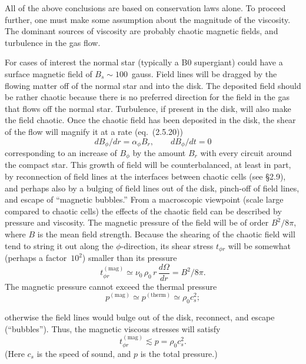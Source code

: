 All of the above conclusions are based on conservation laws alone. To proceed
further, one must make some assumption about the magnitude of the viscosity.
The dominant sources of viscosity are probably chaotic magnetic fields, and
turbulence in the gas flow.

For cases of interest the normal star (typically a B0 supergiant) could
have a surface magnetic field of $B_s \sim 100$~gauss. Field lines will be dragged
by the flowing matter off of the normal star and into the disk. The deposited field
should be rather chaotic because there is no preferred direction for the field
in the gas that flows off the normal star. Turbulence, if present in the disk,
will also make the field chaotic. Once the chaotic field has been deposited in
the disk, the shear of the flow will magnify it at a rate (eq.~(2.5.20))
\begin{equation}
dB_\phi/dr = \alpha_\phi B_r,\qquad dB_\phi/dt = 0
\tag{5.2.26}
\end{equation}
corresponding to an increase of $B_\phi$ by the amount $B_r$ with every circuit around
the compact star. This growth of field will be counterbalanced, at least in part,
by reconnection of field lines at the interfaces between chaotic cells (see \S2.9),
and perhaps also by a bulging of field lines out of the disk, pinch-off of field
lines, and escape of ``magnetic bubbles.'' From a macroscopic viewpoint (scale
large compared to chaotic cells) the effects of the chaotic field can be described by
pressure and viscosity. The magnetic pressure of the field will be of order $B^2/8\pi$, where $B$
is the mean field strength. Because the shearing of the chaotic field will tend to
string it out along the $\phi$-direction, its shear stress $t_{\phi r}$ will be somewhat (perhaps
a factor~$10^2$) smaller than its pressure
\begin{equation}
t_{\phi r}^{(\text{mag})} \simeq \nu_0\,\rho_0\,r\,\frac{d\Omega}{dr}
= B^2/8\pi.
\tag{5.2.27}
\end{equation}
The magnetic pressure cannot exceed the thermal pressure
\begin{equation}
p^{(\text{mag})} \simeq p^{(\text{therm})} \simeq \rho_0 c_s^2;
\tag{5.2.28}
\end{equation}


otherwise the field lines would bulge out of the disk, reconnect, and escape
(``bubbles''). Thus, the magnetic viscous stresses will satisfy
\begin{equation}
t_{\phi r}^{(\text{mag})} \lesssim p = \rho_0 c_s^2.
\tag{5.2.29}
\end{equation}
(Here $c_s$ is the speed of sound, and $p$ is the total pressure.)


